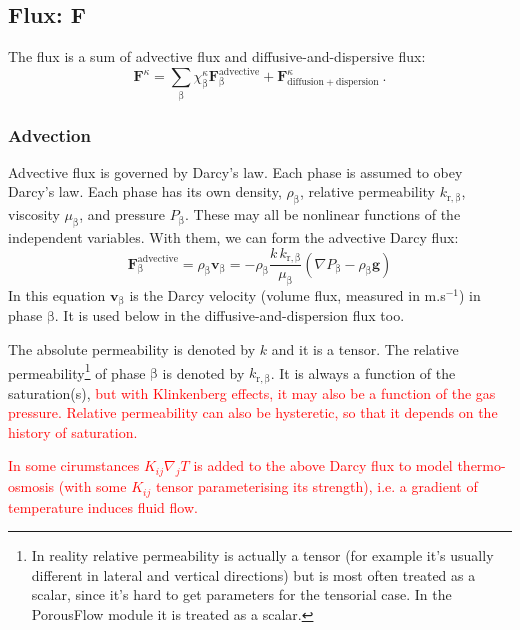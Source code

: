 \documentclass[12pt]{report}
\def\species{\kappa}
\def\phase{\mathrm{\beta}}
\def\massfrac{\chi}
\def\flux{\mathbf{F}}
\def\darcyvel{\mathbf{v}}
\begin{document}
\subsection{Flux: $\flux$}
\label{ssec.flux}

The flux is a sum of advective flux and diffusive-and-dispersive flux:
\begin{equation}
\flux^{\species} =
\sum_{\phase}\massfrac_{\phase}^{\species}\flux_{\phase}^{\mathrm{advective}}
+ \flux^{\species}_{\mathrm{diffusion+dispersion}} \ .
\label{adv.diff.disp.eqn}
\end{equation}

\subsubsection{Advection}

Advective flux is governed by Darcy's law.  Each phase is assumed to
obey Darcy's law.  Each phase has its own density, $\rho_{\phase}$,
relative permeability $k_{\mathrm{r,}\phase}$, viscosity
$\mu_{\phase}$, and pressure $P_{\phase}$.  These may all be nonlinear
functions of the independent variables.  With them, we can form the
advective Darcy flux:
\begin{equation}
\flux_{\phase}^{\mathrm{advective}} = \rho_{\phase}\darcyvel_{\phase} =
-\rho_{\phase}\frac{k\,k_{\mathrm{r,}\phase}}{\mu_{\phase}}(\nabla
P_{\phase} - \rho_{\phase} \mathbf{g})
\label{darc.eqn}
\end{equation}
In this equation $\darcyvel_{\phase}$ is the Darcy velocity (volume
flux, measured in m.s$^{-1}$) in
phase $\phase$.  It is used below in the diffusive-and-dispersion flux
too.

The absolute permeability is denoted by $k$ and it is a tensor.  The
relative permeability\footnote{In reality relative permeability is
  actually a tensor (for example it's usually different in lateral and
  vertical directions) but is most often treated as a scalar, since
  it's hard to get parameters for the tensorial case.  In the
  PorousFlow module it is treated as a scalar.} of phase $\phase$ is
denoted by $k_{\mathrm{r,}\phase}$.  It is always a function of the
saturation(s), \textcolor{red}{but with Klinkenberg effects, it may
  also be a function of the gas pressure.  Relative permeability can
  also be hysteretic, so that it depends on the history of
  saturation.}

\textcolor{red}{In some cirumstances $K_{ij}\nabla_{j}T$ is added to
  the above Darcy flux to model thermo-osmosis (with some $K_{ij}$
  tensor parameterising its strength), i.e. a gradient of temperature
  induces fluid flow.}
\end{document}
